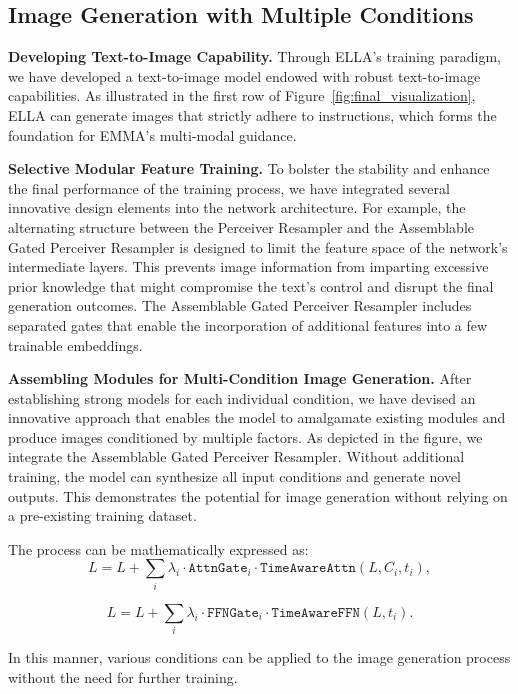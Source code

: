 \subsection{Image Generation with Multiple Conditions}

\textbf{Developing Text-to-Image Capability.} Through ELLA's training paradigm, we have developed a text-to-image model endowed with robust text-to-image capabilities. As illustrated in the first row of Figure~\ref{fig:final_visualization}, ELLA can generate images that strictly adhere to instructions, which forms the foundation for EMMA's multi-modal guidance.

\textbf{Selective Modular Feature Training.} To bolster the stability and enhance the final performance of the training process, we have integrated several innovative design elements into the network architecture. For example, the alternating structure between the Perceiver Resampler and the Assemblable Gated Perceiver Resampler is designed to limit the feature space of the network's intermediate layers. This prevents image information from imparting excessive prior knowledge that might compromise the text's control and disrupt the final generation outcomes. The Assemblable Gated Perceiver Resampler includes separated gates that enable the incorporation of additional features into a few trainable embeddings. 

\textbf{Assembling Modules for Multi-Condition Image Generation.} After establishing strong models for each individual condition, we have devised an innovative approach that enables the model to amalgamate existing modules and produce images conditioned by multiple factors. As depicted in the figure, we integrate the Assemblable Gated Perceiver Resampler. Without additional training, the model can synthesize all input conditions and generate novel outputs. This demonstrates the potential for image generation without relying on a pre-existing training dataset.

The process can be mathematically expressed as:
\begin{equation}
    L = L + \sum_{i} \lambda_i \cdot \mathtt{AttnGate}_i \cdot \mathtt{TimeAwareAttn}(L, C_i, t_i),
\end{equation}

\begin{equation}
    L = L + \sum_{i} \lambda_i \cdot \mathtt{FFNGate}_i \cdot \mathtt{TimeAwareFFN}(L, t_i).
\end{equation}

In this manner, various conditions can be applied to the image generation process without the need for further training.






